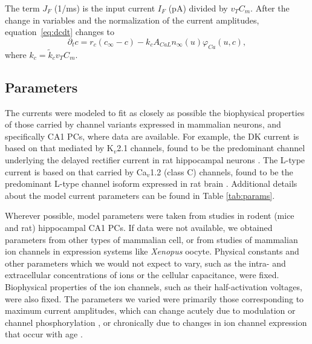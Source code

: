 \documentclass[12pt]{article}
\begin{document}
The term $J_{F}$ (1/ms) is the input current $I_F$ (pA) divided by $v_T C_m$. After the change in variables and the normalization of the current amplitudes,  equation~\eqref{eq:dcdt} changes to \begin{equation}
\partial_t{c} = r_{c}({c_{\infty} - c}) - k_{c} A_{CaL}n_{\infty}(u
) \varphi_{Ca}(u,c),
\label{eq:dcdt2}
\end{equation}
where $k_c = \tilde{k}_c v_T C_m$.

\subsection{Parameters}
The currents were modeled to fit as closely as possible the biophysical properties of those carried by channel variants expressed in mammalian neurons, and specifically CA1 PCs, where data are available. For example, the DK current is based on that mediated by  K$_v$2.1 channels, found to be the predominant channel underlying the delayed rectifier current in rat hippocampal neurons \cite{murakoshi1999identification}. The L-type {\Ca} current is based on that carried by Ca$_v$1.2 (class C) channels, found to be the predominant L-type channel isoform expressed in rat brain \cite{hell1993identification}. Additional details about the model current parameters can be found in Table \ref{tab:params}.

Wherever possible, model parameters were taken from studies in rodent (mice and rat) hippocampal CA1 PCs. If data were not available, we obtained parameters from other types of mammalian cell, or from studies of mammalian ion channels in expression systems like \textit{Xenopus} oocyte. Physical constants and other parameters which we would not expect to vary, such as the intra- and extracellular concentrations of ions or the cellular capacitance, were fixed. Biophysical properties of the ion channels, such as their half-activation voltages, were also fixed. The parameters we varied were primarily those corresponding to maximum current amplitudes, which can change acutely due to modulation or channel phosphorylation \citep{li1992functional,fadool1998modulation}, or chronically due to changes in ion channel expression that occur with age \citep{greer2018whole,herman1998up,veng2002regionally}. 
\end{document}
